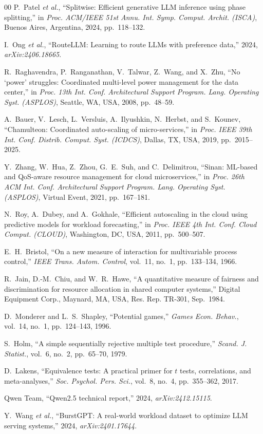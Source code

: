 \documentclass[conference,a4paper]{IEEEtran}
\begin{document}
\begin{thebibliography}{00}
P.~Patel \textit{et al.}, ``Splitwise: Efficient generative LLM inference
using phase splitting,'' in \textit{Proc. ACM/IEEE 51st Annu. Int. Symp.
Comput. Archit. (ISCA)}, Buenos Aires, Argentina, 2024, pp.~118--132.

I.~Ong \textit{et al.}, ``RouteLLM: Learning to route LLMs with preference
data,'' 2024, \textit{arXiv:2406.18665}.

R.~Raghavendra, P.~Ranganathan, V.~Talwar, Z.~Wang, and X.~Zhu, ``No
`power' struggles: Coordinated multi-level power management for the data
center,'' in \textit{Proc. 13th Int. Conf. Architectural Support Program.
Lang. Operating Syst. (ASPLOS)}, Seattle, WA, USA, 2008, pp.~48--59.

A.~Bauer, V.~Lesch, L.~Versluis, A.~Ilyushkin, N.~Herbst, and S.~Kounev,
``Chamulteon: Coordinated auto-scaling of micro-services,'' in
\textit{Proc. IEEE 39th Int. Conf. Distrib. Comput. Syst. (ICDCS)}, Dallas,
TX, USA, 2019, pp.~2015--2025.

Y.~Zhang, W.~Hua, Z.~Zhou, G.~E.~Suh, and C.~Delimitrou, ``Sinan: ML-based
and QoS-aware resource management for cloud microservices,'' in
\textit{Proc. 26th ACM Int. Conf. Architectural Support Program. Lang.
Operating Syst. (ASPLOS)}, Virtual Event, 2021, pp.~167--181.

N.~Roy, A.~Dubey, and A.~Gokhale, ``Efficient autoscaling in the cloud
using predictive models for workload forecasting,'' in \textit{Proc. IEEE
4th Int. Conf. Cloud Comput. (CLOUD)}, Washington, DC, USA, 2011,
pp.~500--507.

E.~H.~Bristol, ``On a new measure of interaction for multivariable process
control,'' \textit{IEEE Trans. Autom. Control}, vol.~11, no.~1,
pp.~133--134, 1966.

R.~Jain, D.-M.~Chiu, and W.~R.~Hawe, ``A quantitative measure of fairness
and discrimination for resource allocation in shared computer systems,''
Digital Equipment Corp., Maynard, MA, USA, Res. Rep. TR-301, Sep.~1984.

D.~Monderer and L.~S.~Shapley, ``Potential games,'' \textit{Games Econ.
Behav.}, vol.~14, no.~1, pp.~124--143, 1996.

S.~Holm, ``A simple sequentially rejective multiple test procedure,''
\textit{Scand. J. Statist.}, vol.~6, no.~2, pp.~65--70, 1979.

D.~Lakens, ``Equivalence tests: A practical primer for $t$ tests,
correlations, and meta-analyses,'' \textit{Soc. Psychol. Pers. Sci.},
vol.~8, no.~4, pp.~355--362, 2017.

Qwen Team, ``Qwen2.5 technical report,'' 2024, \textit{arXiv:2412.15115}.

Y.~Wang \textit{et al.}, ``BurstGPT: A real-world workload dataset to
optimize LLM serving systems,'' 2024, \textit{arXiv:2401.17644}.

\end{thebibliography}
\end{document}
